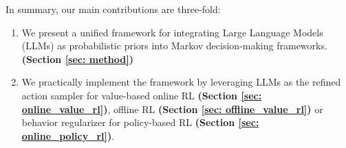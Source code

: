 \documentclass{article} %
\theoremstyle{plain}
\theoremstyle{definition}
\theoremstyle{remark}
\newcommand{\yan}[1]{{ \color{blue}[yan: #1]}}
\begin{document}
In summary, our main contributions are three-fold:
\begin{enumerate}
    \item {We present a unified framework for integrating Large Language Models (LLMs) as probabilistic priors into Markov decision-making frameworks. \textbf{(Section \ref{sec: method})}
} %
    \item {We practically implement the framework by leveraging LLMs as the refined action sampler for value-based online RL \textbf{(Section \ref{sec: online_value_rl})}, offline RL \textbf{(Section \ref{sec: offline_value_rl})} or behavior regularizer for policy-based RL \textbf{(Section \ref{sec: online_policy_rl})}.}

\end{enumerate}
\end{document}
